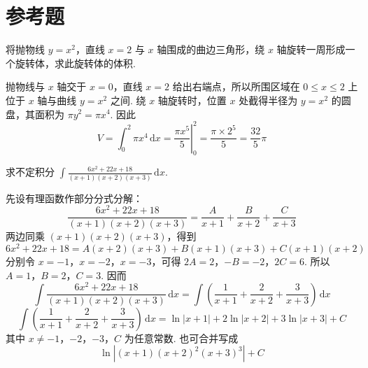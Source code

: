 \section{参考题}

\begin{problem}
将抛物线 \(y=x^2\)，直线 \(x=2\) 与 \(x\) 轴围成的曲边三角形，绕 \(x\) 轴旋转一周形成一个旋转体，求此旋转体的体积.
\end{problem}

\begin{solution}
抛物线与 \(x\) 轴交于 \(x=0\)，直线 \(x=2\) 给出右端点，所以所围区域在 \(0\leq x\leq2\) 上位于 \(x\) 轴与曲线 \(y=x^2\) 之间. 绕 \(x\) 轴旋转时，位置 \(x\) 处截得半径为 \(y=x^2\) 的圆盘，其面积为 \(\pi y^2=\pi x^4\). 因此
\[
V=\int_0^2\pi x^4\,\mathrm{d}x
=\left.\frac{\pi x^5}{5}\right|_0^2
=\frac{\pi\times2^5}{5}=\frac{32}{5}\pi
\]
\end{solution}

\begin{problem}
求不定积分 \(\int \frac{6x^2+22x+18}{\left(x+1\right)\left(x+2\right)\left(x+3\right)}\,\mathrm{d}x\).
\end{problem}

\begin{solution}
先设有理函数作部分分式分解：
\[
\frac{6x^2+22x+18}{\left(x+1\right)\left(x+2\right)\left(x+3\right)}
=\frac{A}{x+1}+\frac{B}{x+2}+\frac{C}{x+3}
\]
两边同乘 \(\left(x+1\right)\left(x+2\right)\left(x+3\right)\)，得到
\[
6x^2+22x+18=A\left(x+2\right)\left(x+3\right)+B\left(x+1\right)\left(x+3\right)+C\left(x+1\right)\left(x+2\right)
\]
分别令 \(x=-1\)，\(x=-2\)，\(x=-3\)，可得 \(2A=2\)，\(-B=-2\)，\(2C=6\).
所以 \(A=1\)，\(B=2\)，\(C=3\). 因而
\[
\int \frac{6x^2+22x+18}{\left(x+1\right)\left(x+2\right)\left(x+3\right)}\,\mathrm{d}x
=\int\left(\frac{1}{x+1}+\frac{2}{x+2}+\frac{3}{x+3}\right)\,\mathrm{d}x
\]
\[
\int\left(\frac{1}{x+1}+\frac{2}{x+2}+\frac{3}{x+3}\right)\,\mathrm{d}x
=\ln|x+1|+2\ln|x+2|+3\ln|x+3|+C
\]
其中 \(x\ne-1\)，\(-2\)，\(-3\)，\(C\) 为任意常数. 也可合并写成
\[
\ln\left|\left(x+1\right)\left(x+2\right)^2\left(x+3\right)^3\right|+C
\]
\end{solution}
